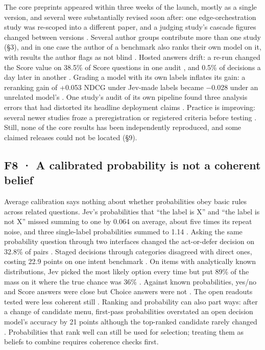 The core preprints appeared within three weeks of the launch, mostly as a single version, and several were substantially revised soon after: one edge-orchestration study was re-scoped into a different paper, and a judging study's cascade figures changed between versions \citep{arxiv2609_23136,arxiv2609_26550}. Several author groups contribute more than one study (§3), and in one case the author of a benchmark also ranks their own model on it, with results the author flags as not blind \citep{arxiv2610_02293,arxiv2610_06744}. Hosted answers drift: a re-run changed the Score value on 38.5\% of Score questions in one audit \citep{arxiv2609_31142}, and 0.5\% of decisions a day later in another \citep{arxiv2610_02267}. Grading a model with its own labels inflates its gain: a reranking gain of +0.053 NDCG under Jev-made labels became −0.028 under an unrelated model's \citep{gh_zhuyansen_jev_search_rerank_eval}. One study's audit of its own pipeline found three analysis errors that had distorted its headline deployment claims \citep{arxiv2610_02267}. Practice is improving: several newer studies froze a preregistration or registered criteria before testing \citep{arxiv2610_07177,arxiv2610_07019,arxiv2610_06985}. Still, none of the core results has been independently reproduced, and some claimed releases could not be located (§9).

\subsection{F8 · A calibrated probability is not a coherent belief}

Average calibration says nothing about whether probabilities obey basic rules across related questions. Jev's probabilities that “the label is X” and “the label is not X” missed summing to one by 0.064 on average, about five times its repeat noise, and three single-label probabilities summed to 1.14 \citep{arxiv2609_33209}. Asking the same probability question through two interfaces changed the act-or-defer decision on 32.8\% of pairs \citep{arxiv2609_37470}. Staged decisions through categories disagreed with direct ones, costing 22.9 points on one intent benchmark \citep{arxiv2609_33971}. On items with analytically known distributions, Jev picked the most likely option every time but put 89\% of the mass on it where the true chance was 36\% \citep{arxiv2610_03935}. Against known probabilities, yes/no and Score answers were close but Choice answers were not \citep{arxiv2609_35342}. The open readouts tested were less coherent still \citep{arxiv2609_33209,arxiv2609_33971}. Ranking and probability can also part ways: after a change of candidate menu, first-pass probabilities overstated an open decision model's accuracy by 21 points although the top-ranked candidate rarely changed \citep{arxiv2610_07716}. Probabilities that rank well can still be used for selection; treating them as beliefs to combine requires coherence checks first.

